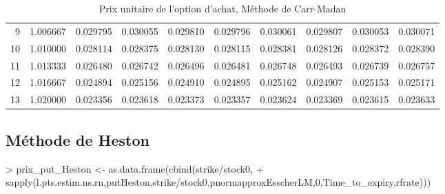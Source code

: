 \documentclass[letter]{report}
\begin{document}
\begin{Schunk}
\begin{table}[ht]
\begin{tabular}{rrrrrrrrrr}
  9 & 1.006667 & 0.029795 & 0.030055 & 0.029810 & 0.029796 & 0.030061 & 0.029807 & 0.030053 & 0.030071 \\ 
  10 & 1.010000 & 0.028114 & 0.028375 & 0.028130 & 0.028115 & 0.028381 & 0.028126 & 0.028372 & 0.028390 \\ 
  11 & 1.013333 & 0.026480 & 0.026742 & 0.026496 & 0.026481 & 0.026748 & 0.026493 & 0.026739 & 0.026757 \\ 
  12 & 1.016667 & 0.024894 & 0.025156 & 0.024910 & 0.024895 & 0.025162 & 0.024907 & 0.025153 & 0.025171 \\ 
  13 & 1.020000 & 0.023356 & 0.023618 & 0.023373 & 0.023357 & 0.023624 & 0.023369 & 0.023615 & 0.023633 \\ 
   \hline
\end{tabular}
\caption{Prix unitaire de l'option d'achat, Méthode de Carr-Madan} 
\end{table}\end{Schunk}

\subsection{Méthode de Heston}

\begin{Schunk}
\begin{Sinput}
> 	prix_put_Heston <- as.data.frame(cbind(strike/stock0,
+ 					sapply(l.pts.estim.ns.rn,putHeston,strike/stock0,pnormapproxEsscherLM,0,Time_to_expiry,rfrate)))
\end{Sinput}
\end{Schunk}
\end{document}
